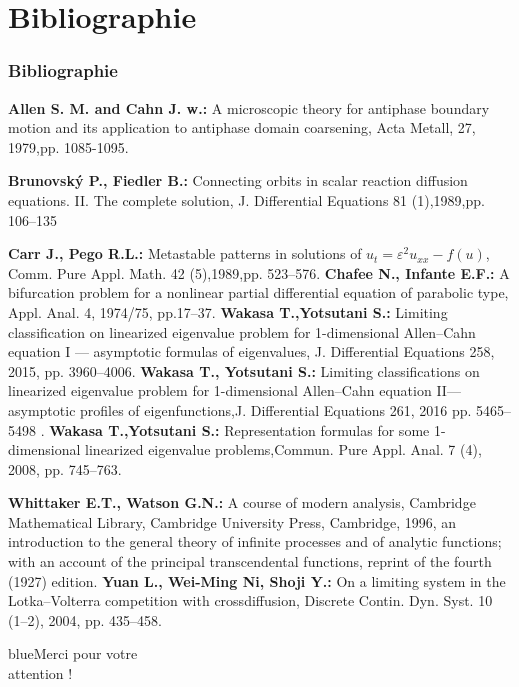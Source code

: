 \documentclass[mathserif,10pt]{beamer}
\begin{document}
\section{Bibliographie}
\begin{frame}[allowframebreaks]\transglitter[duration=1]
  \frametitle<presentation>{Bibliographie}

\begin{thebibliography}{99}
 \beamertemplatebookbibitems
\bibitem{} 
 \textbf{Allen S. M. and Cahn J. w.:} A microscopic theory for antiphase boundary
motion and its application to antiphase domain coarsening, Acta Metall, 27, 1979,pp. 1085-1095. \label{réf22}

\bibitem{} 
 \textbf{Brunovský P.,  Fiedler B.:} Connecting orbits in scalar reaction diffusion equations. II. The complete solution, J. Differential Equations 81 (1),1989,pp. 106–135 \label{réf1}

\bibitem{} 
\textbf{Carr  J., Pego R.L.:} Metastable patterns in solutions of $u_{t}=\varepsilon^{2}u_{xx}-f(u)$, Comm. Pure Appl. Math. 42 (5),1989,pp. 523–576.\label{réf3}
\bibitem{}
 \textbf{Chafee N., Infante E.F.:} A bifurcation problem for a nonlinear partial differential equation of parabolic type, Appl. Anal. 4, 1974/75, pp.17–37. \label{réf4}
   \textbf{Wakasa T.,Yotsutani S.:} Limiting classification on linearized eigenvalue problem for 1-dimensional Allen–Cahn
equation I — asymptotic formulas of eigenvalues, J. Differential Equations 258, 2015, pp. 3960–4006. \label{réf17}
\textbf{ Wakasa T., Yotsutani S.:} Limiting classifications on linearized eigenvalue problem for 1-dimensional Allen–Cahn equation II—asymptotic profiles of eigenfunctions,J. Differential Equations 261, 2016 pp. 5465–5498 . \label{réf15}
 \textbf{Wakasa T.,Yotsutani S.:} Representation formulas for some 1-dimensional linearized eigenvalue problems,Commun. Pure Appl. Anal. 7 (4), 2008, pp. 745–763. \label{réf13}

  \textbf{Whittaker E.T., Watson G.N.:} A course of modern analysis, Cambridge Mathematical Library, Cambridge University Press, Cambridge, 1996, an introduction to the general theory of infinite processes and of analytic functions;
with an account of the principal transcendental functions, reprint of the fourth (1927) edition. \label{réf16}
  \textbf{Yuan L., Wei-Ming Ni, Shoji Y.:} On a limiting system in the Lotka–Volterra competition with crossdiffusion, Discrete Contin. Dyn. Syst. 10 (1–2), 2004, pp. 435–458. \label{réf10}
\end{thebibliography}
\end{frame}
\begin{frame}{}\transglitter[duration=1]
\begin{center}
\Huge \bf \begin{color}{blue}Merci pour votre \\
attention !\end{color}
\end{center}
\end{frame}
\end{document}
